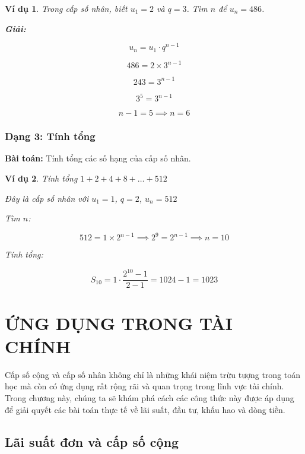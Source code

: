 \documentclass[12pt,a4paper]{report}
\newtheorem{example}{Ví dụ}[section]
\begin{document}
\begin{example}
    Trong cấp số nhân, biết $u_1 = 2$ và $q = 3$. Tìm $n$ để $u_n = 486$.
    
    \textbf{Giải:}
    
    \[
        u_n = u_1 \cdot q^{n-1}
    \]
    
    \[
        486 = 2 \times 3^{n-1}
    \]
    
    \[
        243 = 3^{n-1}
    \]
    
    \[
        3^5 = 3^{n-1}
    \]
    
    \[
        n - 1 = 5 \implies n = 6
    \]
\end{example}

\subsection{Dạng 3: Tính tổng}

\textbf{Bài toán:} Tính tổng các số hạng của cấp số nhân.

\begin{example}
    Tính tổng $1 + 2 + 4 + 8 + \dots + 512$
    
    Đây là cấp số nhân với $u_1 = 1$, $q = 2$, $u_n = 512$
    
    Tìm $n$:
    
    \[
        512 = 1 \times 2^{n-1}
        \implies 2^9 = 2^{n-1}
        \implies n = 10
    \]
    
    Tính tổng:
    
    \[
        S_{10}
        = 1 \cdot \frac{2^{10} - 1}{2 - 1}
        = 1024 - 1 = 1023
    \]
\end{example}


\chapter{ỨNG DỤNG TRONG TÀI CHÍNH}

Cấp số cộng và cấp số nhân không chỉ là những khái niệm trừu tượng trong toán học mà còn có ứng dụng rất rộng rãi và quan trọng trong lĩnh vực tài chính. Trong chương này, chúng ta sẽ khám phá cách các công thức này được áp dụng để giải quyết các bài toán thực tế về lãi suất, đầu tư, khấu hao và dòng tiền.

\section{Lãi suất đơn và cấp số cộng}
\end{document}
